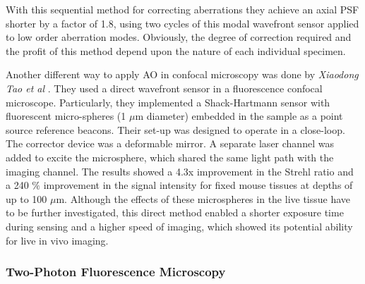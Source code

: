 With this sequential method for correcting aberrations they achieve an axial PSF shorter by a factor of 1.8, using two cycles of this modal wavefront sensor applied to low order aberration modes. Obviously, the degree of correction required and the profit of this method depend upon the nature of each individual specimen. 

Another different way to apply AO in confocal microscopy was done by \textit{Xiaodong Tao et al} \cite{scan_Confocal_direct_sensing}. They used a direct wavefront sensor in a fluorescence confocal microscope. Particularly, they implemented a Shack-Hartmann sensor with fluorescent micro-spheres (1 $\mu$m diameter) embedded in the sample as a point source reference beacons. Their set-up was designed to operate in a close-loop. The corrector device was a deformable mirror. A separate laser channel was added to excite the microsphere, which shared the same light path with the imaging channel. The results showed a 4.3x improvement in the Strehl ratio and a 240 $\%$ improvement in the signal intensity for fixed mouse tissues at depths of up to 100 $\mu$m. Although the effects of these microspheres in the live tissue have to be further investigated, this direct method enabled a shorter exposure time during sensing and a higher speed of imaging, which showed its potential ability for live in vivo imaging.

\subsubsection{Two-Photon Fluorescence Microscopy}
\label{sec:twoPhotonExcitation}

